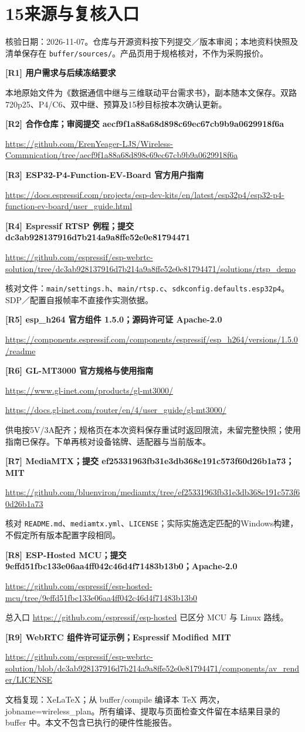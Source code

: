 \documentclass[UTF8,a4paper,11pt,fontset=windows]{ctexart}
\newcommand{\code}[1]{{\small\nolinkurl{#1}}}
\newcommand{\page}[2]{\clearpage\section*{#1\quad #2}\addcontentsline{toc}{section}{#1 #2}}
\newcommand{\source}[3]{\par\medskip\textbf{[#1] #2}\par {\footnotesize\url{#3}}\par}
\begin{document}
\page{15}{来源与复核入口}
{\small 核验日期：2026-11-07。仓库与开源资料按下列提交／版本审阅；本地资料快照及清单保存在 \code{buffer/sources/}。产品页用于规格核对，不作为采购报价。}
\begingroup\small\setlength{\parskip}{4pt}
\par\medskip\textbf{[R1] 用户需求与后续冻结要求}\par
本地原始文件为《数据通信中继与三维联动平台需求书》，副本随本文保存。双路720p25、P4/C6、双中继、预算及15秒目标按本次确认更新。
\source{R2}{合作仓库；审阅提交 aecf9f1a88a68d898c69ec67cb9b9a0629918f6a}{https://github.com/ErenYeager-LJS/Wireless-Commnication/tree/aecf9f1a88a68d898c69ec67cb9b9a0629918f6a}
\source{R3}{ESP32-P4-Function-EV-Board 官方用户指南}{https://docs.espressif.com/projects/esp-dev-kits/en/latest/esp32p4/esp32-p4-function-ev-board/user_guide.html}
\source{R4}{Espressif RTSP 例程；提交 dc3ab928137916d7b214a9a8ffe52e0e81794471}{https://github.com/espressif/esp-webrtc-solution/tree/dc3ab928137916d7b214a9a8ffe52e0e81794471/solutions/rtsp_demo}
核对文件：\code{main/settings.h}、\code{main/rtsp.c}、\code{sdkconfig.defaults.esp32p4}。SDP／配置自报帧率不直接作实测依据。
\source{R5}{esp\_h264 官方组件 1.5.0；源码许可证 Apache-2.0}{https://components.espressif.com/components/espressif/esp_h264/versions/1.5.0/readme}
\source{R6}{GL-MT3000 官方规格与使用指南}{https://www.gl-inet.com/products/gl-mt3000/}
\url{https://docs.gl-inet.com/router/en/4/user_guide/gl-mt3000/}\par
供电按5V/3A配齐；规格页在本次资料保存重试时返回限流，未留完整快照；使用指南已保存。下单再核对设备铭牌、适配器与当前版本。
\source{R7}{MediaMTX；提交 ef25331963fb31e3db368e191c573f60d26b1a73；MIT}{https://github.com/bluenviron/mediamtx/tree/ef25331963fb31e3db368e191c573f60d26b1a73}
核对 \code{README.md}、\code{mediamtx.yml}、\code{LICENSE}；实际实施选定匹配的Windows构建，不假定所有版本配置字段相同。
\source{R8}{ESP-Hosted MCU；提交 9effd51fbc133e06aa4ff042c46d4f71483b13b0；Apache-2.0}{https://github.com/espressif/esp-hosted-mcu/tree/9effd51fbc133e06aa4ff042c46d4f71483b13b0}
总入口 \url{https://github.com/espressif/esp-hosted} 已区分 MCU 与 Linux 路线。
\source{R9}{WebRTC 组件许可证示例；Espressif Modified MIT}{https://github.com/espressif/esp-webrtc-solution/blob/dc3ab928137916d7b214a9a8ffe52e0e81794471/components/av_render/LICENSE}
\endgroup
\vfill
{\footnotesize\color{muted}文档复现：XeLaTeX；从 buffer/compile 编译本 TeX 两次，jobname=wireless\_plan。所有编译、提取与页面检查文件留在本结果目录的 buffer 中。本文不包含已执行的硬件性能报告。}
\end{document}
